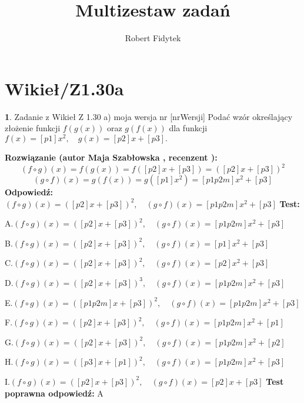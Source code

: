\documentclass[12pt, a4paper]{article}
\title{Multizestaw zadań}
\author{Robert Fidytek}
\date{}
\theoremstyle{definition} %
\newtheorem{zad}{}
\newcommand{\kategoria}[1]{\section{#1}} %
\newcommand{\zadStart}[1]{\begin{zad}#1\newline} %
\newcommand{\zadStop}{\end{zad}}   %
\newcommand{\rozwStart}[2]{\noindent \textbf{Rozwiązanie (autor #1 , recenzent #2): }\newline} %
\newcommand{\rozwStop}{\newline}                                            %
\newcommand{\odpStart}{\noindent \textbf{Odpowiedź:}\newline}    %
\newcommand{\odpStop}{\newline}                                             %
\newcommand{\testStart}{\noindent \textbf{Test:}\newline} %
\newcommand{\testStop}{\newline} %
\newcommand{\kluczStart}{\noindent \textbf{Test poprawna odpowiedź:}\newline} %
\newcommand{\kluczStop}{\newline} %
\begin{document}
\maketitle


\kategoria{Wikieł/Z1.30a}
\zadStart{Zadanie z Wikieł Z 1.30 a)  moja wersja nr [nrWersji]}
Podać wzór określający złożenie funkcji $f(g(x))$ oraz $g(f(x))$ dla funkcji $f(x)=[p1]x^{2},\quad g(x)=[p2]x+[p3].$
\zadStop
\rozwStart{Maja Szabłowska}{}
$$(f\circ g)(x)=f(g(x))=f([p2]x+[p3])=([p2]x+[p3])^{2}$$
$$(g\circ f)(x)=g(f(x))=g([p1]x^{2})=[p1p2m]x^{2}+[p3]$$
\rozwStop
\odpStart
$(f\circ g)(x)=([p2]x+[p3])^{2},\quad (g\circ f)(x)=[p1p2m]x^{2}+[p3]$
\odpStop
\testStart

A.$(f\circ g)(x)=([p2]x+[p3])^{2},\quad (g\circ f)(x)=[p1p2m]x^{2}+[p3]$

B.$(f\circ g)(x)=([p2]x+[p3])^{2},\quad (g\circ f)(x)=[p1]x^{2}+[p3]$

C.$(f\circ g)(x)=([p2]x+[p3])^{2},\quad (g\circ f)(x)=[p2]x^{2}+[p3]$

D.$(f\circ g)(x)=([p2]x+[p3])^{3},\quad (g\circ f)(x)=[p1p2m]x^{2}+[p3]$

E.$(f\circ g)(x)=([p1p2m]x+[p3])^{2},\quad (g\circ f)(x)=[p1p2m]x^{2}+[p3]$

F.$(f\circ g)(x)=([p2]x+[p3])^{2},\quad (g\circ f)(x)=[p1p2m]x^{2}+[p1]$

G.$(f\circ g)(x)=([p2]x+[p3])^{2},\quad (g\circ f)(x)=[p1p2m]x^{2}+[p2]$

H.$(f\circ g)(x)=([p3]x+[p1])^{2},\quad (g\circ f)(x)=[p1p2m]x^{2}+[p3]$

I.$(f\circ g)(x)=([p2]x+[p3])^{2},\quad (g\circ f)(x)=[p2]x+[p3]$
\testStop
\kluczStart
A
\kluczStop
\end{document}

